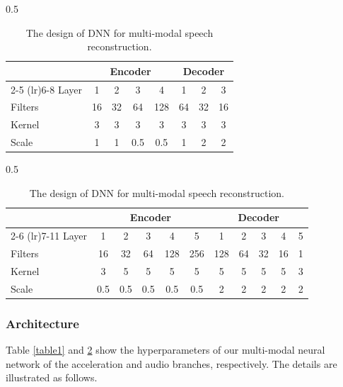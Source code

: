 \begin{table}[ht!]
\centering
\begin{subtable}[t]{0.5\textwidth}
\centering
\begin{tabular}{lccccccc}\toprule
& \multicolumn{4}{c}{Encoder} & \multicolumn{3}{c}{Decoder}
\\\cmidrule(lr){2-5} \cmidrule(lr){6-8}
Layer & 1 & 2 & 3 & 4 & 1 &2 &3 \\\midrule
Filters &16 &32&64&128 & 64&32 & 16\\ 
Kernel &3 &3&3&3&3&3&3\\ 
Scale &1 &1&0.5&0.5&1&2&2\\
\bottomrule
\end{tabular}
\caption{\label{table1}Acceleration branch.}
\end{subtable}

\begin{subtable}[t]{0.5\textwidth}
\begin{tabular}{lcccccccccc}\toprule
& \multicolumn{5}{c}{Encoder} & \multicolumn{5}{c}{Decoder}
\\\cmidrule(lr){2-6} \cmidrule(lr){7-11}
Layer  & 1 & 2 & 3 & 4 & 5 & 1 &2 &3 &4 & 5  \\\midrule
Filters &16 &32&64&128&256& 128 &64 & 32 & 16 & 1 \\ 
Kernel &3 &5&5&5&5&5& 5 &5 & 5 &3\\ 
Scale &0.5 & 0.5 &0.5 &0.5 & 0.5 & 2 &2 & 2 & 2 & 2\\
\bottomrule
\end{tabular}
\caption{\label{table2}Audio branch.}
\end{subtable}
\caption{{The design of DNN for multi-modal speech reconstruction.}}
\end{table}

\subsubsection{\textbf{Architecture}}
Table \ref{table1} and \ref{table2} show the hyperparameters of our multi-modal neural network of the acceleration and audio branches, respectively. The details are illustrated as follows.

